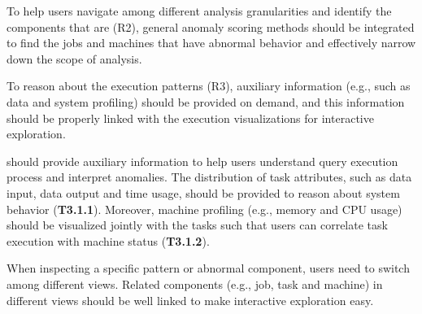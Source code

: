 To help users navigate among different analysis granularities and identify the components that are  (R2), general anomaly scoring methods should be integrated to find the jobs and machines that have abnormal behavior and effectively narrow down the scope of analysis. 

To reason about the execution patterns (R3), auxiliary information (e.g., such as data and system profiling) should be provided on demand, and this information should be properly linked with the execution visualizations for interactive exploration. 

\squishlist
\item[\textbf{T3.1}] 
\qevis{} should provide auxiliary information to help users understand query execution process and interpret anomalies. The distribution of task attributes, such as data input, data output and time usage, should be provided to reason about system behavior (\textbf{T3.1.1}). Moreover, machine profiling (e.g., memory and CPU usage) should be visualized jointly with the tasks such that users can correlate task execution with machine status (\textbf{T3.1.2}).
\item[\textbf{T3.2}] 
When inspecting a specific pattern or abnormal component, users need to switch among different views. 
Related components (e.g., job, task and machine) in different views should be well linked to make interactive exploration easy. 

\squishend